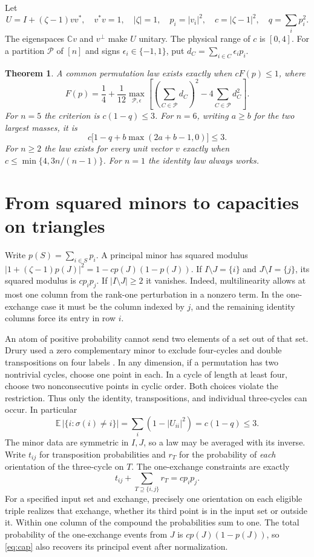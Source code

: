 \documentclass[11pt]{article}
\newtheorem{theorem}{Theorem}
\begin{document}
Let
\[
 U=I+(\zeta-1)vv^*,\quad v^*v=1,\quad |\zeta|=1,\quad
 p_i=|v_i|^2,\quad c=|\zeta-1|^2,\quad q=\sum_i p_i^2 .
\]
The eigenspaces $\mathbb Cv$ and $v^\perp$ make $U$ unitary. The physical range of $c$ is $[0,4]$. For a partition $\mathcal P$ of $[n]$ and signs $\epsilon_i\in\{-1,1\}$, put $d_C=\sum_{i\in C}\epsilon_i p_i$.
\begin{theorem}\label{thm:main}
A common permutation law exists exactly when $cF(p)\le1$, where
\begin{equation}\label{eq:partition}
 F(p)=\frac14+\frac1{12}
  \max_{\mathcal P,\epsilon}
  \left[\left(\sum_{C\in\mathcal P}d_C\right)^2-4\sum_{C\in\mathcal P}d_C^2\right].
\end{equation}
For $n=5$ the criterion is $c(1-q)\le3$. For $n=6$, writing $a\ge b$ for the two largest masses, it is
\[
 c\bigl[1-q+b\max(2a+b-1,0)\bigr]\le3 .
\]
For $n\ge2$ the law exists for every unit vector $v$ exactly when
$c\le\min\{4,3n/(n-1)\}$. For $n=1$ the identity law always works.
\end{theorem}

\section{From squared minors to capacities on triangles}
Write $p(S)=\sum_{i\in S}p_i$. A principal minor has squared modulus
$|1+(\zeta-1)p(J)|^2=1-cp(J)(1-p(J))$. If
$I\setminus J=\{i\}$ and $J\setminus I=\{j\}$, its squared modulus is $cp_i p_j$. If $|I\setminus J|\ge2$ it vanishes. Indeed, multilinearity allows at most one column from the rank-one perturbation in a nonzero term. In the one-exchange case it must be the column indexed by $j$, and the remaining identity columns force its entry in row $i$.

An atom of positive probability cannot send two elements of a set out of that set. Drury used a zero complementary minor to exclude four-cycles and double transpositions on four labels \cite[p.~164]{Drury}. In any dimension, if a permutation has two nontrivial cycles, choose one point in each. In a cycle of length at least four, choose two nonconsecutive points in cyclic order. Both choices violate the restriction. Thus only the identity, transpositions, and individual three-cycles can occur. In particular
\begin{equation}\label{eq:moves}
 \mathbb E\,|\{i:\sigma(i)\ne i\}|=\sum_i(1-|U_{ii}|^2)=c(1-q)\le3 .
\end{equation}
The minor data are symmetric in $I,J$, so a law may be averaged with its inverse. Write $t_{ij}$ for transposition probabilities and $r_T$ for the probability of \emph{each} orientation of the three-cycle on $T$. The one-exchange constraints are exactly
\begin{equation}\label{eq:cap}
 t_{ij}+\sum_{T\supseteq\{i,j\}}r_T=cp_i p_j .
\end{equation}
For a specified input set and exchange, precisely one orientation on each eligible triple realizes that exchange, whether its third point is in the input set or outside it. Within one column of the compound the probabilities sum to one. The total probability of the one-exchange events from $J$ is $cp(J)(1-p(J))$, so \eqref{eq:cap} also recovers its principal event after normalization.
\end{document}
